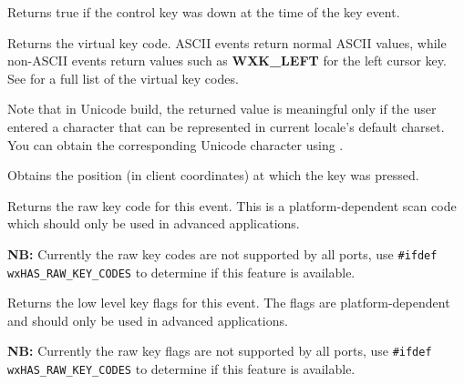 \label{wxkeyeventcontroldown}


Returns true if the control key was down at the time of the key event.


\label{wxkeyeventgetkeycode}


Returns the virtual key code. ASCII events return normal ASCII values,
while non-ASCII events return values such as {\bf WXK\_LEFT} for the
left cursor key. See  for a full list of
the virtual key codes.

Note that in Unicode build, the returned value is meaningful only if the
user entered a character that can be represented in current locale's default
charset. You can obtain the corresponding Unicode character using
.


\label{wxkeyeventgetposition}



Obtains the position (in client coordinates) at which the key was pressed.


\label{wxkeyeventgetrawkeycode}


Returns the raw key code for this event. This is a platform-dependent scan code
which should only be used in advanced applications.

{\bf NB:} Currently the raw key codes are not supported by all ports, use
{\tt\#ifdef wxHAS\_RAW\_KEY\_CODES} to determine if this feature is available.


\label{wxkeyeventgetrawkeyflags}


Returns the low level key flags for this event. The flags are
platform-dependent and should only be used in advanced applications.

{\bf NB:} Currently the raw key flags are not supported by all ports, use
{\tt \#ifdef wxHAS\_RAW\_KEY\_CODES} to determine if this feature is available.



